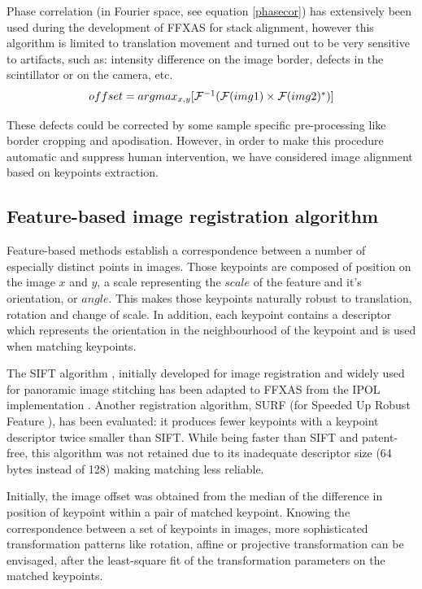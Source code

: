 \documentclass[preprint]{iucr}
\begin{document}
Phase correlation (in Fourier space, see equation \ref{phasecor}) has
extensively been used during the development of FFXAS for stack alignment, however this algorithm is limited to
translation movement and turned out to be very sensitive to artifacts, such as:
intensity difference on the image border, defects in the scintillator or on
the camera, etc.
\begin{equation}
\label{phasecor}
$$offset =
argmax_{x,y}[\mathcal{F}^{-1}(\mathcal{F}(img1)\times\mathcal{F}(img2)^*)]$$
\end{equation}


These defects could be corrected by some sample
specific pre-processing like border cropping and apodisation.
However, in order to make this procedure automatic and suppress human intervention, we
have considered image alignment based on keypoints extraction. 


\subsection{Feature-based image registration algorithm}

Feature-based methods establish a correspondence between a
number of especially distinct points in images. 
Those keypoints are composed of position on the image 
$x$ and $y$, a scale representing the $scale$ of the feature and it's
orientation, or $angle$. This makes those keypoints naturally robust to
translation, rotation and change of scale.
In addition, each keypoint contains a descriptor which represents the
orientation in the neighbourhood of the keypoint and is used when matching
keypoints.

The SIFT algorithm \cite{Lowe99,Lowe04}, initially developed for image
registration and widely used for panoramic image stitching has been adapted to
FFXAS from the IPOL implementation \cite{ASIFT}.  
Another registration algorithm, SURF (for Speeded Up Robust Feature
\cite{surf}), has been evaluated: it produces fewer keypoints with a keypoint
descriptor twice smaller than SIFT.
While being faster than SIFT and patent-free, this algorithm was not
retained due to its inadequate descriptor size (64 bytes instead of 128)
making matching less reliable.

Initially, the image offset was obtained from the median of the
difference in position of keypoint within a pair of matched keypoint.
Knowing the correspondence between a set of keypoints in images,
more sophisticated transformation patterns like rotation, affine 
or projective transformation can be envisaged, after the least-square fit of the
transformation parameters on the matched keypoints.
\end{document}
